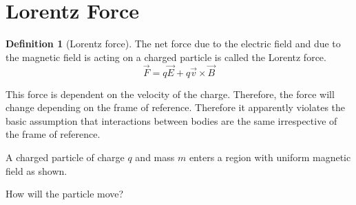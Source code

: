 \documentclass[fleqn, a4paper, 12pt, twoside]{article}
\theoremstyle{definition}
\newtheorem{definition}{Definition}
\theoremstyle{theorem}
\begin{document}
\section{Lorentz Force}

\begin{definition}[Lorentz force]
	The net force due to the electric field and due to the magnetic field is acting on a charged particle is called the Lorentz force.
	\begin{equation*}
		\overrightarrow{F} = q \overrightarrow{E} + q \overrightarrow{v} \times \overrightarrow{B}
	\end{equation*}
\end{definition}
This force is dependent on the velocity of the charge.
Therefore, the force will change depending on the frame of reference.
Therefore it apparently violates the basic assumption that interactions between bodies are the same irrespective of the frame of reference.

\begin{question}
	A charged particle of charge $q$ and mass $m$ enters a region with uniform magnetic field as shown.
	\begin{figure}[H]
	\end{figure}
	How will the particle move?
\end{question}
\end{document}
